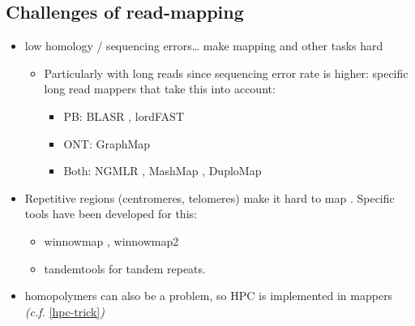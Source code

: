 \documentclass[
  11pt,
  twoside]{scrbook}
\providecommand{\tightlist}{%
  \setlength{\itemsep}{0pt}\setlength{\parskip}{0pt}}
\begin{document}
\hypertarget{challenges-of-read-mapping}{%
\subsection{Challenges of read-mapping}\label{challenges-of-read-mapping}}

\begin{itemize}
\tightlist
\item
  low homology / sequencing errors\ldots{} make mapping and other tasks hard \autocite{gusfieldAlgorithmsStringsTrees1997}

  \begin{itemize}
  \item
    Particularly with long reads since sequencing error rate is higher: specific long read mappers that take this into account:

    \begin{itemize}
    \item
      PB: BLASR \autocite{chaissonMappingSingleMolecule2012}, lordFAST \autocite{haghshenasLordFASTSensitiveFast2019}
    \item
      ONT: GraphMap \autocite{sovicFastSensitiveMapping2016}
    \item
      Both: NGMLR \autocite{sedlazeckAccurateDetectionComplex2018}, MashMap \autocite{jainFastApproximateAlgorithm2018}, DuploMap \autocite{prodanovSensitiveAlignmentUsing2020}
    \end{itemize}
  \end{itemize}
\item
  Repetitive regions (centromeres, telomeres) make it hard to map \autocite{alserTechnologyDictatesAlgorithms2021}. Specific tools have been developed for this:

  \begin{itemize}
  \item
    winnowmap \autocite{jainWeightedMinimizerSampling2020}, winnowmap2 \autocite{jainLongreadMappingRepetitive2022}
  \item
    tandemtools \autocite{mikheenkoTandemToolsMappingLong2020} for tandem repeats.
  \end{itemize}
\item
  homopolymers can also be a problem, so HPC is implemented in mappers \emph{(c.f.} \ref{hpc-trick}\emph{)}
\end{itemize}

\printbibliography[segment=\therefsegment,heading=subbibintoc,title={References for chapter \thechapter}]
\end{document}
